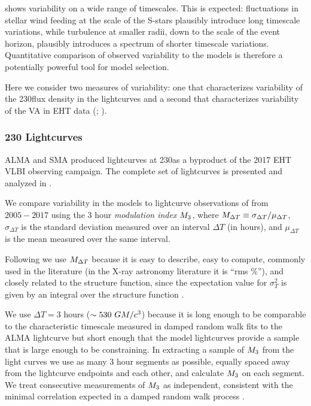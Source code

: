 \sgra shows variability on a wide range of timescales.  This is expected: fluctuations in stellar wind feeding at the scale of the S-stars plausibly introduce long timescale variations, while turbulence at smaller radii, down to the scale of the event horizon, plausibly introduces a spectrum of shorter timescale variations.  Quantitative comparison of observed variability to the models is therefore a potentially powerful tool for model selection.

Here we consider two measures of variability: one that characterizes variability of the 230\GHz flux density in the lightcurves \citep{Wielgus2022} and a second that characterizes variability of the VA in EHT data (; \citealt{NoiseModeling}).


\subsubsection{230 \GHz Lightcurves}

ALMA and SMA produced \sgra lightcurves at 230\GHz as a byproduct of the 2017 EHT VLBI observing campaign. The complete set of lightcurves is presented and analyzed in \cite{Wielgus2022}.

We compare variability in the models to lightcurve observations of \sgra from $2005-2017$ using the 3 hour {\em modulation index} $M_{3}$, where $M_{\Delta T} \equiv \sigma_{\Delta T}/\mu_{\Delta T}$, $\sigma_{\Delta T}$ is the standard deviation measured over an interval $\Delta T$ (in hours), and $\mu_{\Delta T}$ is the mean measured over the same interval.

Following \citet{2015ApJ...812..103C} we use $M_{\Delta T}$ because it is easy to describe, easy to compute, commonly used in the literature (in the X-ray astronomy literature it is ``rms \%''), and closely related to the structure function, since the expectation value for $\sigma_T^2$ is given by an integral over the structure function \citep[see][]{Lee_2022}.

We use $\Delta T = 3$ hours ($\sim 530~GM/c^3$) because it is long enough to be comparable to the characteristic timescale measured in damped random walk fits to the ALMA lightcurve \citep[see Table 10 of][]{Wielgus2022} but short enough that the model lightcurves provide a sample that is large enough to be constraining.  In extracting a sample of $M_{3}$ from the light curves we use as many 3 hour segments as possible, equally spaced away from the lightcurve endpoints and each other, and calculate $M_{3}$ on each segment.  We treat consecutive measurements of $M_{3}$ as independent, consistent with the minimal correlation expected in a damped random walk process \citep{Lee_2022}.

